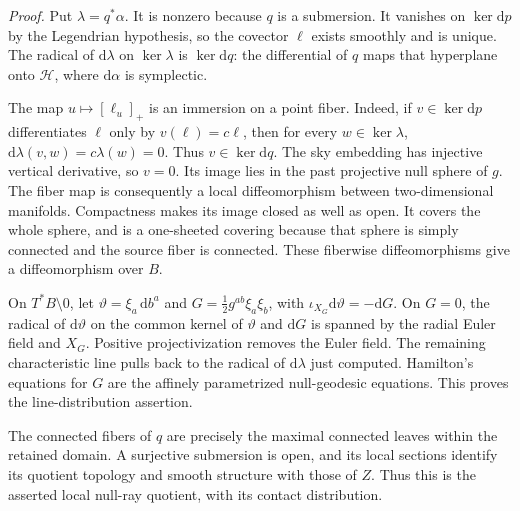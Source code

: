 \documentclass[
  english,
  11pt,
  reqno]{amsart}
\begin{document}
\emph{Proof.} Put \(\lambda=q^*\alpha\). It is nonzero because \(q\) is
a submersion. It vanishes on \(\ker\mathrm dp\) by the Legendrian
hypothesis, so the covector \(\ell\) exists smoothly and is unique. The
radical of \(\mathrm d\lambda\) on \(\ker\lambda\) is
\(\ker\mathrm dq\): the differential of \(q\) maps that hyperplane onto
\(\mathcal H\), where \(\mathrm d\alpha\) is symplectic.

The map \(u\mapsto[\ell_u]_+\) is an immersion on a point fiber. Indeed,
if \(v\in\ker\mathrm dp\) differentiates \(\ell\) only by
\(v(\ell)=c\ell\), then for every \(w\in\ker\lambda\),
\(\mathrm d\lambda(v,w)=c\lambda(w)=0\). Thus \(v\in\ker\mathrm dq\).
The sky embedding has injective vertical derivative, so \(v=0\). Its
image lies in the past projective null sphere of \(g\). The fiber map is
consequently a local diffeomorphism between two-dimensional manifolds.
Compactness makes its image closed as well as open. It covers the whole
sphere, and is a one-sheeted covering because that sphere is simply
connected and the source fiber is connected. These fiberwise
diffeomorphisms give a diffeomorphism over \(B\).

On \(T^*B\setminus0\), let \(\vartheta=\xi_a\,\mathrm db^a\) and
\(G=\tfrac12g^{ab}\xi_a\xi_b\), with
\(\iota_{X_G}\mathrm d\vartheta=-\mathrm dG\). On \(G=0\), the radical
of \(\mathrm d\vartheta\) on the common kernel of \(\vartheta\) and
\(\mathrm dG\) is spanned by the radial Euler field and \(X_G\).
Positive projectivization removes the Euler field. The remaining
characteristic line pulls back to the radical of \(\mathrm d\lambda\)
just computed. Hamilton's equations for \(G\) are the affinely
parametrized null-geodesic equations. This proves the line-distribution
assertion.

The connected fibers of \(q\) are precisely the maximal connected leaves
within the retained domain. A surjective submersion is open, and its
local sections identify its quotient topology and smooth structure with
those of \(Z\). Thus this is the asserted local null-ray quotient, with
its contact distribution.
\end{document}
